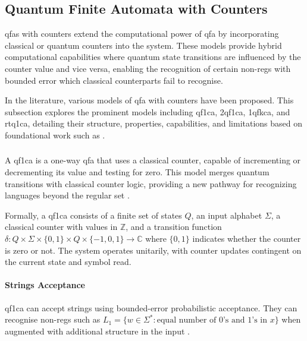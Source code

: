 \subsection{Quantum Finite Automata with Counters}
\label{sec:qfa-with-counters}

\glspl{qfa} with counters extend the computational power of \gls{qfa} by incorporating classical or quantum counters into the system. These models provide hybrid computational capabilities where quantum state transitions are influenced by the counter value and vice versa, enabling the recognition of certain non-\glspl{reg} with bounded error which classical counterparts fail to recognise.

In the literature, various models of \gls{qfa} with counters have been proposed. This subsection explores the prominent models including \gls{qf1ca}, \gls{2qf1ca}, \gls{1qfkca}, and \gls{rtq1ca}, detailing their structure, properties, capabilities, and limitations based on foundational work such as \cite{bonner2001quantum, kravtsev1999quantum, pani2011empowering, cem2012quantum}.

\subsubsection{}

A \gls{qf1ca} is a one-way \gls{qfa} that uses a classical counter, capable of incrementing or decrementing its value and testing for zero. This model merges quantum transitions with classical counter logic, providing a new pathway for recognizing languages beyond the regular set \cite{kravtsev1999quantum}.

\begin{definition}[\gls{qf1ca}]
Formally, a \gls{qf1ca} consists of a finite set of states $Q$, an input alphabet $\Sigma$, a classical counter with values in $\mathbb{Z}$, and a transition function $\delta: Q \times \Sigma \times \{0,1\} \times Q \times \{-1,0,1\} \rightarrow \mathbb{C}$ where $\{0,1\}$ indicates whether the counter is zero or not. The system operates unitarily, with counter updates contingent on the current state and symbol read.
\end{definition}

\paragraph{Strings Acceptance} 
\gls{qf1ca} can accept strings using bounded-error probabilistic acceptance. They can recognise non-\glspl{reg} such as $L_1 = \{ w \in \Sigma^* : \text{equal number of 0's and 1's in } x \}$ when augmented with additional structure in the input \cite{bonner2001quantum}.


